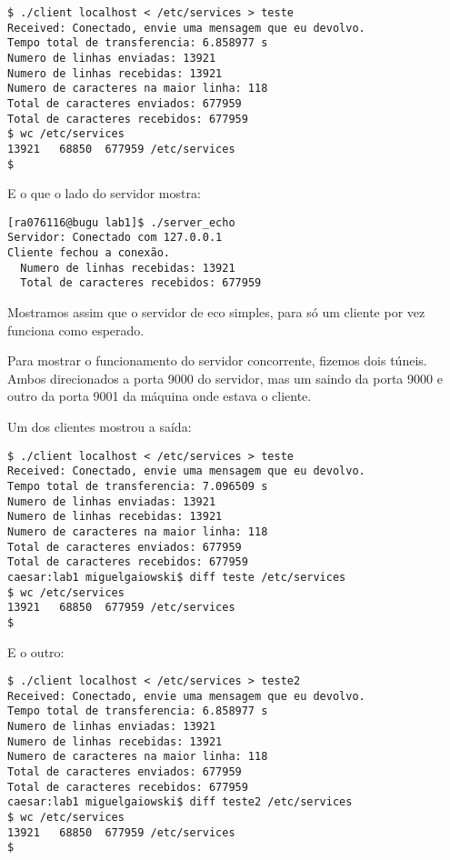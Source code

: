 \documentclass[12pt,a4paper]{article}
\begin{document}
\begin{verbatim}
$ ./client localhost < /etc/services > teste
Received: Conectado, envie uma mensagem que eu devolvo.
Tempo total de transferencia: 6.858977 s
Numero de linhas enviadas: 13921
Numero de linhas recebidas: 13921
Numero de caracteres na maior linha: 118
Total de caracteres enviados: 677959
Total de caracteres recebidos: 677959
$ wc /etc/services 
13921   68850  677959 /etc/services
$
\end{verbatim}

E o que o lado do servidor mostra:

\begin{verbatim}
[ra076116@bugu lab1]$ ./server_echo 
Servidor: Conectado com 127.0.0.1
Cliente fechou a conexão.
  Numero de linhas recebidas: 13921
  Total de caracteres recebidos: 677959
\end{verbatim}

Mostramos assim que o servidor de eco simples, para só um cliente por
vez funciona como esperado. 

Para mostrar o funcionamento do servidor concorrente, fizemos dois
túneis. Ambos direcionados a porta 9000 do servidor, mas um saindo da
porta 9000 e outro da porta 9001 da máquina onde estava o cliente.

Um dos clientes mostrou a saída:

\begin{verbatim}
$ ./client localhost < /etc/services > teste
Received: Conectado, envie uma mensagem que eu devolvo.
Tempo total de transferencia: 7.096509 s
Numero de linhas enviadas: 13921
Numero de linhas recebidas: 13921
Numero de caracteres na maior linha: 118
Total de caracteres enviados: 677959
Total de caracteres recebidos: 677959
caesar:lab1 miguelgaiowski$ diff teste /etc/services 
$ wc /etc/services 
13921   68850  677959 /etc/services
$
\end{verbatim}

E o outro: 

\begin{verbatim}
$ ./client localhost < /etc/services > teste2
Received: Conectado, envie uma mensagem que eu devolvo.
Tempo total de transferencia: 6.858977 s
Numero de linhas enviadas: 13921
Numero de linhas recebidas: 13921
Numero de caracteres na maior linha: 118
Total de caracteres enviados: 677959
Total de caracteres recebidos: 677959
caesar:lab1 miguelgaiowski$ diff teste2 /etc/services 
$ wc /etc/services 
13921   68850  677959 /etc/services
$
\end{verbatim}
\end{document}
